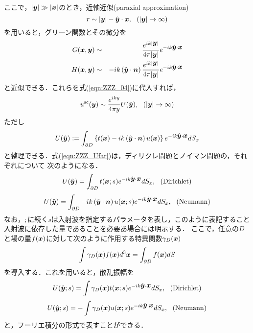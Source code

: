 ここで，$\left|\mbox{\boldmath $y$}\right|\gg \left| \mbox{\boldmath $x$} \right|$のとき，近軸近似(paraxial approximation)
\begin{equation}
	r\sim  |\fat{y}|  -\hat{\fat{y}}\cdot \fat{x}, \ \ ( |\fat{y}|\rightarrow \infty)
	\label{eqn:ZZZ_para}
\end{equation}
を用いると，グリーン関数とその微分を
\begin{eqnarray}
	G(\mbox{\boldmath $x$},\mbox{\boldmath $y$}) &\sim&
	\frac{e^{ik|\mbox{\boldmath $y$}|}}{4\pi |\mbox{\boldmath $y$}|} 
	e^{-ik\hat{\mbox{\boldmath $y$}}\cdot \mbox{\boldmath $x$}}
	\label{eqn:ZZZ_Gfar}
	\\ 
	H(\mbox{\boldmath $x$},\mbox{\boldmath $y$}) &\sim&
	-ik \left( \hat{\mbox{\boldmath $y$}}\cdot\mbox{\boldmath $n$}  \right)
	\frac{e^{ik|\mbox{\boldmath $y$}|}}{4\pi |\mbox{\boldmath $y$}|} 
	e^{-ik\hat{\mbox{\boldmath $y$}}\cdot \mbox{\boldmath $x$}}
	\label{eqn:ZZZ_Hfar}
\end{eqnarray}
と近似できる．これらを式(\ref{eqn:ZZZ_04})に代入すれば，
\begin{equation}
	u^{\rm sc}(\fat{y}) \sim \frac{e^{iky}}{4\pi y} U(\hat{\fat{y}}), \ \ 
	(|\fat{y}|\rightarrow \infty)
	\label{eqn:ZZZ_07}
\end{equation}
ただし
\begin{equation}
	U(\hat{\mbox{\boldmath $y$}}) 
	:=
	\int_{\partial D}
	\left\{t(\mbox{\boldmath $x$})-ik \left( \hat{\mbox{\boldmath $y$}}\cdot \mbox{\boldmath $n$}\right) u(\mbox{\boldmath $x$}) \right\}
	e^{-ik\hat{\mbox{\boldmath $y$}}\cdot \mbox{\boldmath $x$}}
	dS_x
	\label{eqn:ZZZ_Ufar}
\end{equation}
と整理できる．式(\ref{eqn:ZZZ_Ufar})は，ディリクレ問題とノイマン問題の，それぞれについて
次のようになる．
\begin{equation}
	U(\hat{\mbox{\boldmath $y$}})  
	= \int _{\partial D} t(\mbox{\boldmath $x$};s)e^{-ik\hat{\mbox{\boldmath $y$}}\cdot \mbox{\boldmath $x$}} dS_x
	, \ \ ( {\rm Dirichlet})
	\label{eqn:ZZZ_08}
\end{equation}
\begin{equation}
	U(\hat{\mbox{\boldmath $y$}})  =
	\int _{\partial D} 
	-ik\left(\hat{\mbox{\boldmath $y$}}\cdot \mbox{\boldmath $n$}\right) 
	u(\mbox{\boldmath $x$};s)e^{-ik\hat{\mbox{\boldmath $y$}}\cdot \mbox{\boldmath $x$}} dS_x
	, \ \ ({\rm Neumann})
	\label{eqn:ZZZ_09}
\end{equation}
なお，$;$に続く$s$は入射波を指定するパラメータを表し，このように表記すること
入射波に依存した量であることを必要あ場合には明示する．
ここで，任意の$D$と場の量$f(\mbox{\boldmath $x$})$に対して次のように作用する特異関数$\gamma_D(\mbox{\boldmath $x$})$
\begin{equation}
	\int \gamma_D(\mbox{\boldmath $x$})f(\mbox{\boldmath $x$})d^3\mbox{\boldmath $x$} =\int _{\partial D} f(\mbox{\boldmath $x$}) dS
	\label{eqn:ZZZ_10}
\end{equation}
を導入する．これを用いると，散乱振幅を
\begin{equation}
	U(\hat{\mbox{\boldmath $y$}};s)  = \int \gamma_D(\mbox{\boldmath $x$})t(\mbox{\boldmath $x$};s)e^{-ik\hat{\mbox{\boldmath $y$}}\cdot \mbox{\boldmath $x$}} dS_x
	, \ \ ( {\rm Dirichlet})
	\label{eqn:ZZZ_11}
\end{equation}
\begin{equation}
	U(\hat{\mbox{\boldmath $y$}};s)  =-\int \gamma_D(\mbox{\boldmath $x$})u(\mbox{\boldmath $x$};s)e^{-ik\hat{\mbox{\boldmath $y$}}\cdot \mbox{\boldmath $x$}} dS_x
	, \ \ ({\rm Neumann})
	\label{eqn:ZZZ_12}
\end{equation}
と，フーリエ積分の形式で表すことができる．
